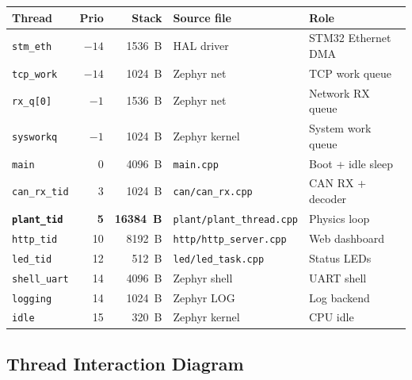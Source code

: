 \documentclass[11pt,a4paper]{article}
\begin{document}
\begin{center}
\begin{tabular}{lrrll}
\toprule
Thread & Prio & Stack & Source file & Role \\
\midrule
\texttt{stm\_eth} & $-14$ & \SI{1536}{B} & HAL driver & STM32 Ethernet DMA \\
\texttt{tcp\_work} & $-14$ & \SI{1024}{B} & Zephyr net & TCP work queue \\
\texttt{rx\_q[0]} & $-1$ & \SI{1536}{B} & Zephyr net & Network RX queue \\
\texttt{sysworkq} & $-1$ & \SI{1024}{B} & Zephyr kernel & System work queue \\
\texttt{main} & 0 & \SI{4096}{B} & \texttt{main.cpp} & Boot + idle sleep \\
\texttt{can\_rx\_tid} & 3 & \SI{1024}{B} & \texttt{can/can\_rx.cpp} & CAN RX + decoder \\
\textbf{\texttt{plant\_tid}} & \textbf{5} & \textbf{\SI{16384}{B}} & \texttt{plant/plant\_thread.cpp} & Physics loop \\
\texttt{http\_tid} & 10 & \SI{8192}{B} & \texttt{http/http\_server.cpp} & Web dashboard \\
\texttt{led\_tid} & 12 & \SI{512}{B} & \texttt{led/led\_task.cpp} & Status LEDs \\
\texttt{shell\_uart} & 14 & \SI{4096}{B} & Zephyr shell & UART shell \\
\texttt{logging} & 14 & \SI{1024}{B} & Zephyr LOG & Log backend \\
\texttt{idle} & 15 & \SI{320}{B} & Zephyr kernel & CPU idle \\
\bottomrule
\end{tabular}
\end{center}

\subsection{Thread Interaction Diagram}
\end{document}
